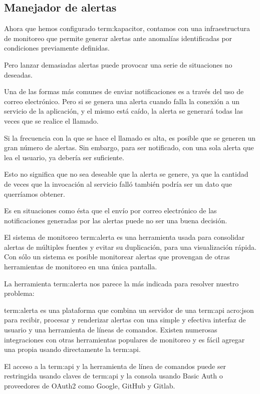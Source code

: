 \subsection{Manejador de alertas}
\label{manejador-alertas}

Ahora que hemos configurado \gls{term:kapacitor}, contamos con una
infraestructura de monitoreo que permite generar alertas ante anomalías
identificadas por condiciones previamente definidas.

Pero lanzar demasiadas alertas puede provocar una serie de situaciones no
deseadas.

Una de las formas más comunes de enviar notificaciones es a través del uso de
correo electrónico. Pero si se genera una alerta cuando falla la conexión a un
servicio de la aplicación, y el mismo está caído, la alerta se generará todas
las veces que se realice el llamado.

Si la frecuencia con la que se hace el llamado es alta, es posible que se
generen un gran número de alertas. Sin embargo, para ser notificado, con una
sola alerta que lea el usuario, ya debería ser suficiente.

Esto no significa que no sea deseable que la alerta se genere, ya que la
cantidad de veces que la invocación al servicio falló también podría ser un
dato que querríamos obtener.

Es en situaciones como ésta que el envío por correo electrónico de las
notificaciones generadas por las alertas puede no ser una buena decisión.

El sistema de monitoreo \gls{term:alerta} es una herramienta usada para
consolidar alertas de múltiples fuentes y evitar su duplicación, para una
visualización rápida. Con sólo un sistema es posible monitorear alertas que
provengan de otras herramientas de monitoreo en una única pantalla.

La herramienta \gls{term:alerta} nos parece la más indicada para resolver
nuestro problema:

\gls{term:alerta} es una plataforma que combina un servidor de una
\gls{term:api} \gls{acro:json} para recibir, procesar y renderizar alertas con
una simple y efectiva interfaz de usuario  y una herramienta de
líneas de comandos. Existen numerosas integraciones con otras herramientas
populares de monitoreo y es fácil agregar una propia usando directamente la
\gls{term:api}.

El acceso a la \gls{term:api} y la herramienta de línea de comandos puede ser
restringida usando claves de \gls{term:api} y la consola usando Basic Auth o
proveedores de OAuth2 como Google, GitHub y Gitlab.

